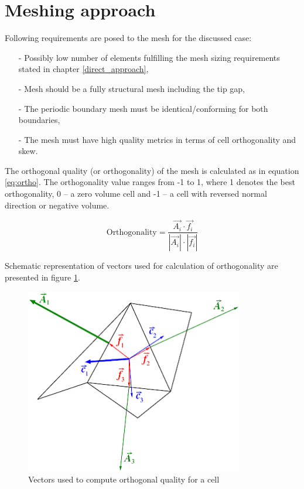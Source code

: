 \section{Meshing approach} \label{mesh}
Following requirements are posed to the mesh for the discussed case:
\begin{itemize}
\item[-]Possibly low number of elements fulfilling the mesh sizing requirements stated in chapter \ref{direct_approach},
\item[-] Mesh should be a fully structural mesh including the tip gap,
\item[-] The periodic boundary mesh must be identical/conforming for both boundaries,
\item[-] The mesh must have high quality metrics in terms of cell orthogonality and skew.
\end{itemize}

The orthogonal quality (or orthogonality) of the mesh is calculated as in equation \ref{eq:ortho}. The orthogonality value ranges from -1 to 1, where 1 denotes the best orthogonality, 0 -- a zero volume cell and -1 -- a cell with reversed normal direction or negative volume.

\begin{equation} \label{eq:ortho}
\text{Orthogonality} = \frac{\vec{A_i} \cdot \vec{f_i}}{|\vec{A_i}| \cdot |\vec{f_i}|}
\end{equation}

Schematic representation of vectors used for calculation of orthogonality are presented in figure \ref{ortho}.

\begin{figure}[ht!]
\centering %
\includegraphics[width=0.85\textwidth]{Pictures/Quality_Orthogonal_cell.png}
\caption{Vectors used to compute orthogonal quality for a cell}
\label{ortho}
\end{figure}

